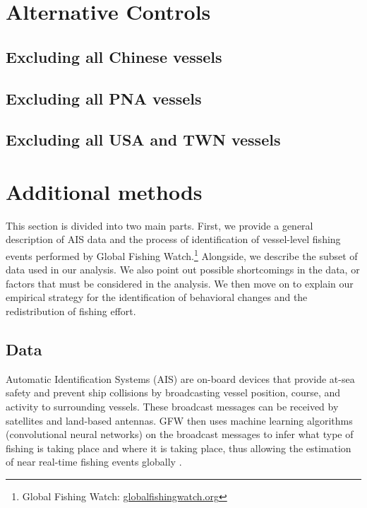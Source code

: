 \documentclass[9p,twocolumn,twoside,lineno]{pnas-new}
\begin{document}
\clearpage

\section{Alternative Controls}
\subsection{Excluding all Chinese vessels}



\clearpage
\subsection{Excluding all PNA vessels}



\clearpage

\subsection{Excluding all USA and TWN vessels}



\clearpage

\section{Additional methods}

This section is divided into two main parts. First, we provide a general description of AIS data and the process of identification of vessel-level fishing events performed by Global Fishing Watch.\footnote{Global Fishing Watch: \url{globalfishingwatch.org}} Alongside, we describe the subset of data used in our analysis. We also point out possible shortcomings in the data, or factors that must be considered in the analysis. We then move on to explain our empirical strategy for the identification of behavioral changes and the redistribution of fishing effort.

\subsection{Data}

Automatic Identification Systems (AIS) are on-board devices that provide at-sea safety and prevent ship collisions by broadcasting vessel position, course, and activity to surrounding vessels. These broadcast messages can be received by satellites and land-based antennas. GFW then uses machine learning algorithms (convolutional neural networks) on the broadcast messages to infer what type of fishing is taking place and where it is taking place, thus allowing the estimation of near real-time fishing events globally \citep{kroodsma_2018}.
\end{document}
